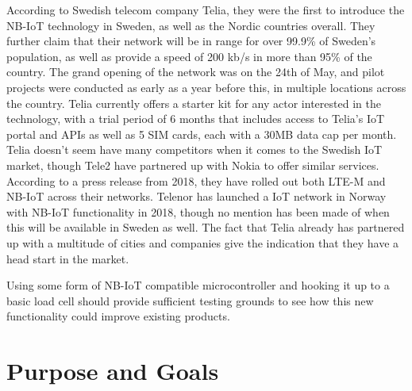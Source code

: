 According to Swedish telecom company Telia, they were the first to introduce the NB-IoT technology in Sweden, as well as the Nordic countries overall\cite{telia-nb}. They further claim that their network will be in range for over 99.9\% of Sweden's population, as well as provide a speed of 200 kb/s in more than 95\% of the country.\cite{telia-first} The grand opening of the network was on the 24th of May, and pilot projects were conducted as early as a year before this, in multiple locations across the country. Telia currently offers a starter kit  for any actor interested in the technology, with a trial period of 6 months that includes access to Telia's IoT portal and APIs as well as 5 SIM cards, each with a 30MB data cap per month. Telia doesn't seem have many competitors when it comes to the Swedish IoT market, though Tele2 have partnered up with Nokia to offer similar services. According to a press release from 2018, they have rolled out both LTE-M and NB-IoT across their networks.\cite{tele2-nokia} Telenor has launched a IoT network in Norway with NB-IoT functionality in 2018, though no mention has been made of when this will be available in Sweden as well.\cite{telenor-iot} The fact that Telia already has partnered up with a multitude of cities and companies give the indication that they have a head start in the market.


Using some form of NB-IoT compatible microcontroller and hooking it up to a basic load cell should provide sufficient testing grounds to see how this new functionality could improve existing products.

\section{Purpose and Goals}
\iffalse
\begin{itemize}
	\item Write about the grand scheme of things
	\item Set the correct expectations
	\item What can I expect to learn if I keep on reading?
	\item What are the success criteria for this work?
	\item How will the work be evaluated? %
\end{itemize}
\fi

